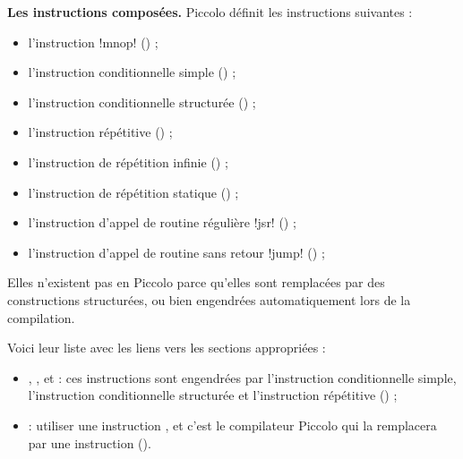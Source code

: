 \textbf{Les instructions composées.} Piccolo définit les instructions suivantes :
\begin{itemize}
  \item l'instruction \pic!mnop! () ;
  \item l'instruction conditionnelle simple () ;
  \item l'instruction conditionnelle structurée () ;
  \item l'instruction répétitive () ;
  \item l'instruction de répétition infinie () ;
  \item l'instruction de répétition statique () ;
  \item l'instruction d'appel de routine régulière \pic!jsr! () ;
  \item l'instruction d'appel de routine sans retour \pic!jump! () ;
\end{itemize}





Elles n’existent pas en Piccolo parce qu’elles sont remplacées par des constructions structurées, ou bien engendrées automatiquement lors de la compilation.

Voici leur liste avec les liens vers les sections appropriées :\begin{itemize}
  \item {}, ,  et  : ces instructions sont engendrées par l’instruction conditionnelle simple, l’instruction conditionnelle structurée et l’instruction répétitive () ;
  \item {} : utiliser une instruction , et c’est le compilateur Piccolo qui la remplacera par une instruction  ().

\end{itemize}







